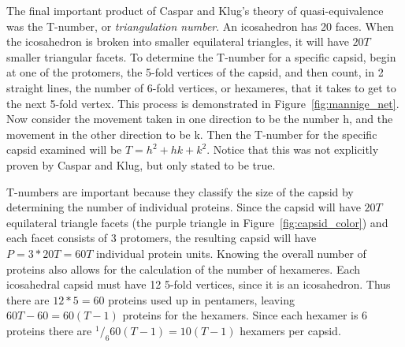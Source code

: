 \documentclass[12pt,letter]{article}
\newcommand*\rfrac[2]{{}^{#1}\!/_{#2}}
\begin{document}
The final important product of Caspar and Klug's theory of quasi-equivalence was the T-number, or \textit{triangulation number}. An icosahedron has 20 faces. When the icosahedron is broken into smaller equilateral triangles, it will have $20T$ smaller triangular facets. To determine the T-number for a specific capsid, begin at one of the protomers, the 5-fold vertices of the capsid, and then count, in 2 straight lines, the number of 6-fold vertices, or hexameres, that it takes to get to the next 5-fold vertex. This process is demonstrated in Figure~\ref{fig:mannige_net}. Now consider the movement taken in one direction to be the number h, and the movement in the other direction to be k. Then the T-number for the specific capsid examined will be $T = h^2 + hk + k^2$. Notice that this was not explicitly proven by Caspar and Klug, but only stated to be true.

T-numbers are important because they classify the size of the capsid by determining the number of individual proteins. Since the capsid will have $20T$ equilateral triangle facets (the purple triangle in Figure~\ref{fig:capsid_color}) and each facet consists of 3 protomers, the resulting capsid will have $P=3*20T =60T$ individual protein units. Knowing the overall number of proteins also allows for the calculation of the number of hexameres. Each icosahedral capsid must have 12 5-fold vertices, since it is an icosahedron. Thus there are $12*5=60$ proteins used up in pentamers, leaving $60T-60 = 60(T-1)$ proteins for the hexamers. Since each hexamer is 6 proteins there are $\rfrac{1}{6} 60(T-1) = 10(T-1)$ hexamers per capsid.
\end{document}
